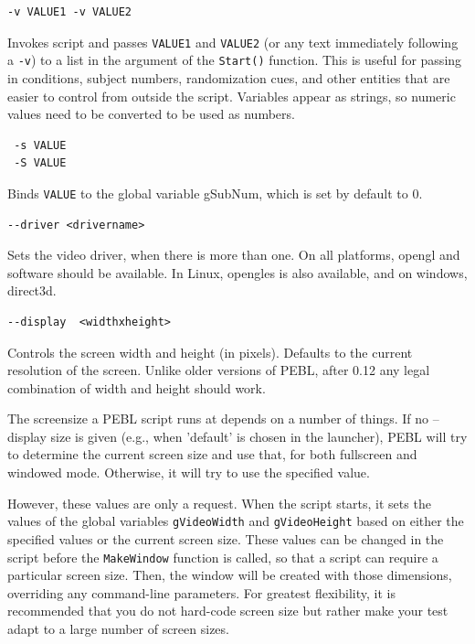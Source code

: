 \begin{description}

\item
\begin{verbatim}
-v VALUE1 -v VALUE2
\end{verbatim}
  Invokes script and passes \texttt{VALUE1} and \texttt{VALUE2} (or any text
  immediately following a \texttt{-v}) to a list in the argument of
  the \texttt{Start()}  function. \newline This is useful for passing in
  conditions, subject numbers, randomization cues, and other
  entities that are easier to control from outside  the
  script.  Variables appear as strings, so numeric values
  need to be converted to be used as numbers.

\item
\begin{verbatim}
 -s VALUE
 -S VALUE
\end{verbatim}
  Binds \texttt{VALUE} to the global variable gSubNum, which is set by
  default to 0.

\item 
\begin{verbatim}
--driver <drivername>
\end{verbatim}
  Sets the video driver, when there is more than one. On all platforms, opengl and software should
  be available.   In Linux, opengles is also available, and on windows, direct3d.

\item
\begin{verbatim}
--display  <widthxheight>
\end{verbatim}
  Controls the screen width and height (in pixels). Defaults
  to the current resolution of the screen.  Unlike older versions of PEBL, 
after 0.12 any legal combination of width and height should work.

The screensize a PEBL script runs at depends on a number of things. If no --display size is given
 (e.g., when 'default' is chosen in the launcher), PEBL will try to determine the current screen size 
and use that, for both fullscreen and windowed mode.  Otherwise, it will try to use the specified value.

However, these values are only a request.  When the script starts, it sets the values
of the global variables \texttt{gVideoWidth} and \texttt{gVideoHeight} based on either the 
specified values or the current screen size.  These values can be changed in the script before the \texttt{MakeWindow} function is called,
so that a script can require a particular screen size. 
Then, the window will be created with those dimensions, 
overriding any command-line parameters.   For greatest flexibility, it is recommended that you do not
hard-code screen size but rather make your test adapt to a large number of screen sizes.


\end{description}
